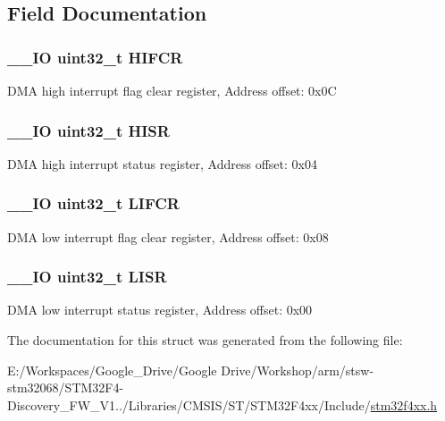 \subsection{Field Documentation}
\hypertarget{struct_d_m_a___type_def_ac55c27aeea4107813c1e7da3fcf46961}{
\subsubsection[{H\-I\-F\-C\-R}]{\setlength{\rightskip}{0pt plus 5cm}\-\_\-\-\_\-\-I\-O uint32\-\_\-t H\-I\-F\-C\-R}}\label{struct_d_m_a___type_def_ac55c27aeea4107813c1e7da3fcf46961}
D\-M\-A high interrupt flag clear register, Address offset\-: 0x0\-C \hypertarget{struct_d_m_a___type_def_a6fe40f7ac1a18c2726b328b5ec02b262}{
\subsubsection[{H\-I\-S\-R}]{\setlength{\rightskip}{0pt plus 5cm}\-\_\-\-\_\-\-I\-O uint32\-\_\-t H\-I\-S\-R}}\label{struct_d_m_a___type_def_a6fe40f7ac1a18c2726b328b5ec02b262}
D\-M\-A high interrupt status register, Address offset\-: 0x04 \hypertarget{struct_d_m_a___type_def_ac4f7bf4cb172024bfc940c00167cd04e}{
\subsubsection[{L\-I\-F\-C\-R}]{\setlength{\rightskip}{0pt plus 5cm}\-\_\-\-\_\-\-I\-O uint32\-\_\-t L\-I\-F\-C\-R}}\label{struct_d_m_a___type_def_ac4f7bf4cb172024bfc940c00167cd04e}
D\-M\-A low interrupt flag clear register, Address offset\-: 0x08 \hypertarget{struct_d_m_a___type_def_a5cdef358e9e95b570358e1f6a3a7f492}{
\subsubsection[{L\-I\-S\-R}]{\setlength{\rightskip}{0pt plus 5cm}\-\_\-\-\_\-\-I\-O uint32\-\_\-t L\-I\-S\-R}}\label{struct_d_m_a___type_def_a5cdef358e9e95b570358e1f6a3a7f492}
D\-M\-A low interrupt status register, Address offset\-: 0x00 

The documentation for this struct was generated from the following file\-:\begin{DoxyCompactItemize}
\item 
E\-:/\-Workspaces/\-Google\-\_\-\-Drive/\-Google Drive/\-Workshop/arm/stsw-\/stm32068/\-S\-T\-M32\-F4-\/\-Discovery\-\_\-\-F\-W\-\_\-\-V1../\-Libraries/\-C\-M\-S\-I\-S/\-S\-T/\-S\-T\-M32\-F4xx/\-Include/\hyperlink{stm32f4xx_8h}{stm32f4xx.\-h}\end{DoxyCompactItemize}
